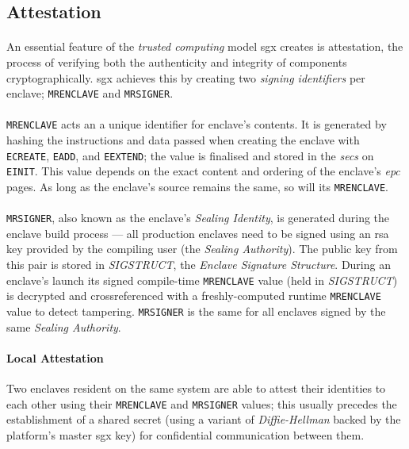 \subsection{Attestation}
\label{sec:attestation}

\paragraph{} An essential feature of the \textit{trusted computing} model \acrshort{sgx} creates is attestation, the process of verifying both the authenticity and integrity of components cryptographically. \acrshort{sgx} achieves this by creating two \textit{signing identifiers} per enclave; \texttt{MRENCLAVE} and \texttt{MRSIGNER}.~\cite{Anati2013InnovativeTF,sgx-prov-service}

\paragraph{} \texttt{MRENCLAVE} acts an a unique identifier for enclave's contents. It is generated by hashing the instructions and data passed when creating the enclave with \texttt{ECREATE}, \texttt{EADD}, and \texttt{EEXTEND}; the value is finalised and stored in the \textit{\acrshort{secs}} on \texttt{EINIT}. This value depends on the exact content and ordering of the enclave's \textit{\acrshort{epc}} pages. As long as the enclave's source remains the same, so will its \texttt{MRENCLAVE}.

\paragraph{} \texttt{MRSIGNER}, also known as the enclave's \textit{Sealing Identity}, is generated during the enclave build process --- all production enclaves need to be signed using an \acrshort{rsa} key provided by the compiling user (the \textit{Sealing Authority}). The public key from this pair is stored in \textit{SIGSTRUCT}, the \textit{Enclave Signature Structure}. During an enclave's launch its signed compile-time \texttt{MRENCLAVE} value (held in \textit{SIGSTRUCT}) is decrypted and crossreferenced with a freshly-computed runtime \texttt{MRENCLAVE} value to detect tampering. \texttt{MRSIGNER} is the same for all enclaves signed by the same \textit{Sealing Authority}.

\paragraph{Local Attestation} Two enclaves resident on the same system are able to attest their identities to each other using their \texttt{MRENCLAVE} and \texttt{MRSIGNER} values; this usually precedes the establishment of a shared secret (using a variant of \textit{Diffie-Hellman} backed by the platform's master \acrshort{sgx} key) for confidential communication between them.

